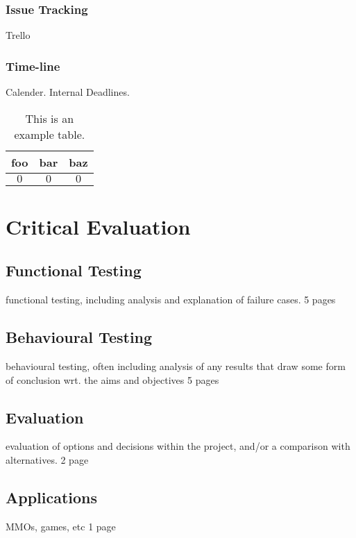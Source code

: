 \documentclass[ %
                    author={Dillon Keith Diep [INCOMPLETE DRAFT, NOT FOR SUBMISSION]},
                supervisor={Dr. Carl Henrik Ek},
                    degree={MEng},
                     title={ARt-CG:},
                  subtitle={Assisted Real-time Content Generation of 3D Hair by Learning Manifolds},
                      type={Research},
                      year={2014} ]{dissertation}
\begin{document}
\subsection{Issue Tracking}
Trello

\subsection{Time-line}
Calender.
Internal Deadlines.

\begin{table}[!h]
	\centering
	\begin{tabular}{|cc|c|}
		\hline
		foo      & bar      & baz      \\
		\hline
		$0     $ & $0     $ & $0     $ \\
		\hline
	\end{tabular}
	\caption{This is an example table.}
	\label{tab}
\end{table}


\chapter{Critical Evaluation}
\label{chap:evaluation}

\section{Functional Testing}
functional  testing, including analysis and explanation of failure cases.
5 pages
      
\section{Behavioural Testing}
behavioural testing, often including analysis of any results that draw some form of conclusion wrt. the aims and objectives
5 pages

\section{Evaluation}
evaluation of options and decisions within the project, and/or a comparison with alternatives.
2 page

\section{Applications}
MMOs, games, etc
1 page
\end{document}
